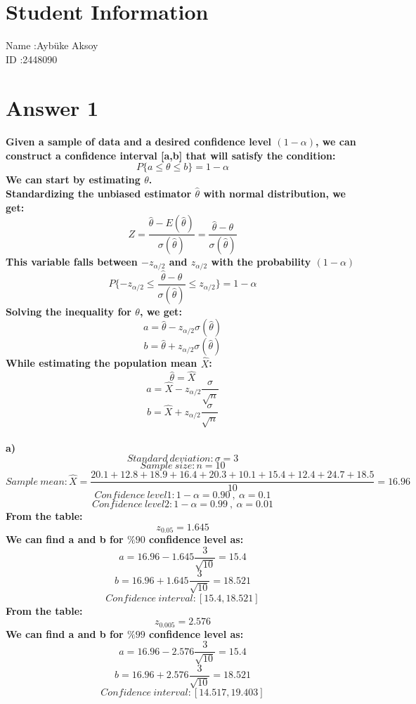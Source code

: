 \documentclass[12pt]{article}
\begin{document}
\section*{Student Information}

Name :Aybüke Aksoy\\

ID :2448090 \\


\section*{Answer 1}
\paragraph{
Given a sample of data and a desired confidence level $(1-\alpha)$, we can construct a confidence interval [a,b] that will satisfy the condition:
\[P\{a \leq \theta \leq b\}=1-\alpha\]
We can start by estimating $\theta$.\\
Standardizing the unbiased estimator $\hat{\theta}$ with normal distribution, we get:
\[Z=\frac{\hat{\theta}-E(\hat{\theta})}{\sigma(\hat{\theta})}=\frac{\hat{\theta}-\theta}{\sigma(\hat{\theta})}\]
This variable falls between $-z_{\alpha/2}$ and $z_{\alpha/2}$ with the probability $(1-\alpha)$
\[P\{-z_{\alpha/2} \leq \frac{\hat{\theta}-\theta}{\sigma(\hat{\theta})} \leq z_{\alpha/2}\}=1-\alpha\]
Solving the inequality for $\theta$, we get:
\[a=\hat{\theta}-z_{\alpha/2}\sigma(\hat{\theta})\]
\[b=\hat{\theta}+z_{\alpha/2}\sigma(\hat{\theta})\]
While estimating the population mean $\hat{X}$:\\
\[\hat{\theta}=\hat{X}\]
\[a=\hat{X}-z_{\alpha/2}\frac{\sigma}{\sqrt{n}}\]
\[b=\hat{X}+z_{\alpha/2}\frac{\sigma}{\sqrt{n}}\]
}
\paragraph{a)
\[Standard \ deviation :\sigma=3\]
\[Sample \ size : n=10\]
\[Sample \ mean : \hat{X}=\frac{20.1+12.8+18.9+16.4+20.3+10.1+15.4+12.4+24.7+18.5}{10}=16.96\]
\[Confidence \ level1 : 1-\alpha=0.90 \ ,\ \alpha=0.1\]
\[Confidence \ level2 : 1-\alpha=0.99 \ ,\ \alpha=0.01\]
From the table:
\[z_{0.05}=1.645\]
We can find a and b for $\%90$ confidence level as:
\[a=16.96-1.645\frac{3}{\sqrt{10}}=15.4\]
\[b=16.96+1.645\frac{3}{\sqrt{10}}=18.521\]
\[Confidence \ interval : [15.4,18.521]\]
From the table:
\[z_{0.005}=2.576\]
We can find a and b for $\%99$ confidence level as:
\[a=16.96-2.576\frac{3}{\sqrt{10}}=15.4\]
\[b=16.96+2.576\frac{3}{\sqrt{10}}=18.521\]
\[Confidence \ interval : [14.517,19.403]\]
}
\end{document}

